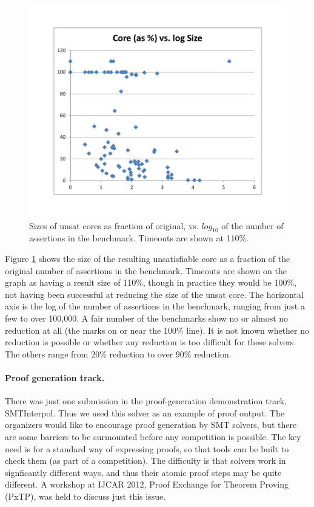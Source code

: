 \documentclass[twosize,11pt]{article}
\begin{document}
\begin{figure}[t]
\centering
\includegraphics[width=\textwidth]{SMTCOMP-Core2.pdf}
\caption{Sizes of unsat cores as fraction of original, vs. $log_{10}$ of the number of assertions in the benchmark. Timeouts are shown at 110\%.}
\label{Fig:cores}
\end{figure}

Figure \ref{Fig:cores} shows the size of the resulting unsatisfiable core as a fraction of the original number of assertions in the benchmark. Timeouts are shown on the graph as having a result size of 110\%, though in practice they would be 100\%, not having been successful at reducing the size of the unsat core. The horizontal axis is the log of the number of assertions in the benchmark, ranging from just a few to over 100,000. A fair number of the benchmarks show no or almost no reduction at all (the marks on or near the 100\% line). It is not known whether no reduction is possible or whether any reduction is too difficult for these solvers. The others range from 20\% reduction to over 90\% reduction.

\paragraph{Proof generation track.} There was just one submission in the proof-generation demonstration track, SMTInterpol. Thus we used this solver as an example of proof output. The organizers would like to encourage proof generation by SMT solvers, but there are some barriers to be surmounted before any competition is possible. The key need is for a standard way of expressing proofs, so that tools can be built to check them (as part of a competition). The difficulty is that solvers work in signficantly different ways, and thus their atomic proof steps may be quite different. A workshop at IJCAR 2012, Proof Exchange for Theorem Proving (PxTP), was held to discuss just this issue.
\end{document}
